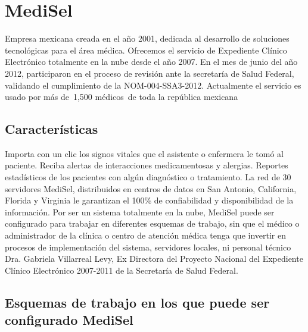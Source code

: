 \section{MediSel}
Empresa mexicana creada en el año 2001, dedicada al desarrollo de soluciones tecnológicas para el área médica.
Ofrecemos el servicio de Expediente Clínico Electrónico totalmente en la nube desde el año 2007. En el mes de junio del año 2012, participaron en el proceso de revisión ante la secretaría de Salud Federal, validando el cumplimiento de la NOM-004-SSA3-2012.
Actualmente el servicio es usado por más de 1,500 médicos de toda la república mexicana \cite{Villareal}
\subsection{Características}
Importa con un clic los signos vitales que el asistente o enfermera le tomó al paciente. Reciba alertas de interacciones medicamentosas y alergias. Reportes estadísticos de los pacientes con algún diagnóstico o tratamiento. La red de 30 servidores MediSel, distribuidos en centros de datos en San Antonio, California, Florida y Virginia le garantizan el 100\% de confiabilidad y disponibilidad de la información. Por ser un sistema totalmente en la nube, MediSel puede ser configurado para trabajar en diferentes esquemas de trabajo, sin que el médico o administrador de la clínica o centro de atención médica tenga que invertir en procesos de implementación del sistema, servidores locales, ni personal técnico \cite{Villareal}
Dra. Gabriela Villarreal Levy, Ex Directora del Proyecto Nacional del Expediente Clínico Electrónico 2007-2011 de la Secretaría de Salud Federal.

\subsection{Esquemas de trabajo en los que puede ser configurado MediSel}

